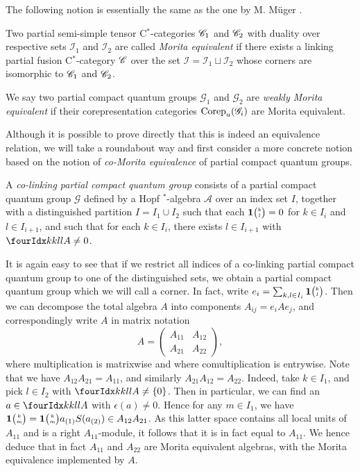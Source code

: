 The following notion is essentially the same as the one by M. M\"{u}ger \cite{Mug1}. 

\begin{Def} Two partial semi-simple tensor C$^*$-categories $\mathscr{C}_1$ and $\mathscr{C}_2$ with duality over respective sets $\mathscr{I}_1$ and $\mathscr{I}_2$ are called \emph{Morita equivalent} if there exists a linking partial fusion C$^*$-category $\mathscr{C}$ over the set $\mathscr{I}=\mathscr{I}_1\sqcup \mathscr{I}_2$ whose corners are isomorphic to $\mathscr{C}_1$ and $\mathscr{C}_2$.

We say two partial compact quantum groups $\mathscr{G}_1$ and $\mathscr{G}_2$ are \emph{weakly Morita equivalent} if their corepresentation categories $\mathrm{Corep}_u(\mathscr{G}_i)$ are Morita equivalent. 
\end{Def} 

Although it is possible to prove directly that this is indeed an equivalence relation, we will take a roundabout way and first consider a more concrete notion based on the notion of \emph{co-Morita equivalence} of partial compact quantum groups.

\begin{Def}\label{DefCoLink} A \emph{co-linking partial compact quantum group} consists of a partial compact quantum group $\mathscr{G}$ defined by a Hopf $^*$-algebra $\mathscr{A}$ over an index set $I$, together with a distinguished partition $I = I_1\cup I_2$ such that each $\mathbf{1}{\tiny {\begin{pmatrix} k\\l\end{pmatrix}}}=0$ for $k\in I_i$ and $l\in I_{i+1}$, and such that for each $k\in I_i$, there exists $l\in I_{i+1}$ with $\Gr{A}{k}{l}{k}{l}\neq 0$.  
\end{Def} 

It is again easy to see that if we restrict all indices of a co-linking partial compact quantum group to one of the distinguished sets, we obtain a partial compact quantum group which we will call a corner. In fact, write $e_i = \sum_{k,l\in I_i} \mathbf{1}{\tiny {\begin{pmatrix} k\\l\end{pmatrix}}}$. Then we can decompose the total algebra $A$ into components $A_{ij} = e_{i}Ae_{j}$, and correspondingly write $A$ in matrix notation \[ A = \begin{pmatrix} A_{11} & A_{12}  \\ A_{21} & A_{22}\end{pmatrix},\] where multiplication is matrixwise and where comultiplication is entrywise. Note that we have $A_{12}A_{21} = A_{11}$, and similarly $A_{21}A_{12} = A_{22}$. Indeed, take $k\in I_1$, and pick $l\in I_2$ with $\Gr{A}{k}{l}{k}{l}\neq \{0\}$. Then in particular, we can find an $a\in \Gr{A}{k}{l}{k}{l}$ with $\epsilon(a)\neq 0$. Hence for any $m\in I_1$, we have $\mathbf{1}{\tiny {\begin{pmatrix} k\\m\end{pmatrix}}} = \mathbf{1}{\tiny {\begin{pmatrix} k\\m\end{pmatrix}}} a_{(1)}S(a_{(2)}) \in A_{12}A_{21}$. As this latter space contains all local units of $A_{11}$ and is a right $A_{11}$-module, it follows that it is in fact equal to $A_{11}$. We hence deduce that in fact $A_{11}$ and $A_{22}$ are Morita equivalent algebras, with the Morita equivalence implemented by $A$. %

